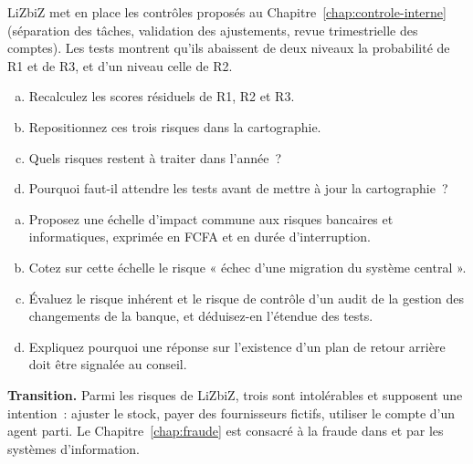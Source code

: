 \begin{boxexo}[title={\ding{45}\quad Exercice~3.2. Après les contrôles \niveaumoyen}]
LiZbiZ met en place les contrôles proposés au Chapitre~\ref{chap:controle-interne}
(séparation des tâches, validation des ajustements, revue trimestrielle des
comptes). Les tests montrent qu'ils abaissent de deux niveaux la probabilité
de R1 et de R3, et d'un niveau celle de R2.
\begin{enumerate}[(a)]
    \item Recalculez les scores résiduels de R1, R2 et R3.
    \item Repositionnez ces trois risques dans la cartographie.
    \item Quels risques restent à traiter dans l'année~?
    \item Pourquoi faut-il attendre les tests avant de mettre à jour la
          cartographie~?
\end{enumerate}
\end{boxexo}

\begin{boxexo}[title={\ding{45}\quad Exercice~3.3. Une échelle commune pour la BANQUE SANAGA \niveauexpert}]
\begin{enumerate}[(a)]
    \item Proposez une échelle d'impact commune aux risques bancaires et
          informatiques, exprimée en FCFA et en durée d'interruption.
    \item Cotez sur cette échelle le risque « échec d'une migration du
          système central ».
    \item Évaluez le risque inhérent et le risque de contrôle d'un audit de
          la gestion des changements de la banque, et déduisez-en l'étendue
          des tests.
    \item Expliquez pourquoi une réponse \NEK{} sur l'existence d'un plan de
          retour arrière doit être signalée au conseil.
\end{enumerate}
\end{boxexo}

\bigskip

\begin{boxinfo}
\textbf{Transition.} Parmi les risques de LiZbiZ, trois sont intolérables et
supposent une intention~: ajuster le stock, payer des fournisseurs fictifs,
utiliser le compte d'un agent parti. Le Chapitre~\ref{chap:fraude} est
consacré à la fraude dans et par les systèmes d'information.
\end{boxinfo}
